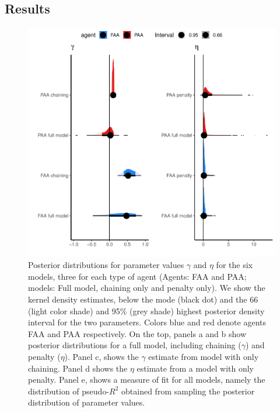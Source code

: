 \documentclass[
  12pt,
]{article}
\begin{document}
\hypertarget{results}{%
\subsection{Results}\label{results}}

\begin{figure}
\includegraphics[width=1\linewidth]{manuscript_BE_files/figure-latex/post-1} \caption{Posterior distributions for parameter values $\gamma$ and $\eta$ for the six models, three for each type of agent (Agents: FAA and PAA; models: Full model, chaining only and penalty only). We show the kernel density estimates, below the mode (black dot) and the 66 (light color shade) and 95\% (grey shade)  highest posterior density interval for the two parameters. Colors blue and red denote agents FAA and PAA respectively. On the top, panels a and b show posterior distributions for a full model, including chaining ($\gamma$) and penalty ($\eta$). Panel c, shows the $\gamma$ estimate from model with only chaining. Panel d shows the $\eta$ estimate from a model with only penalty. Panel e, shows a measure of fit for all models, namely the distribution of pseudo-$R^2$ obtained from sampling the posterior distribution of parameter values.}\label{fig:post}
\end{figure}
\end{document}
